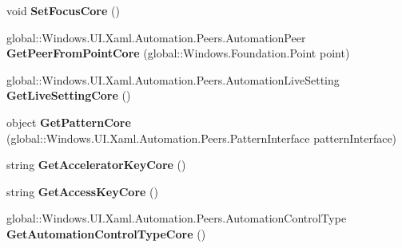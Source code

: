 \begin{DoxyCompactItemize}
void {\bfseries Set\+Focus\+Core} ()
\item 
\mbox{\label{interface_windows_1_1_u_i_1_1_xaml_1_1_automation_1_1_peers_1_1_i_automation_peer_overrides_a74922a18e90493219309cd53efda7477}} 
global\+::\+Windows.\+U\+I.\+Xaml.\+Automation.\+Peers.\+Automation\+Peer {\bfseries Get\+Peer\+From\+Point\+Core} (global\+::\+Windows.\+Foundation.\+Point point)
\item 
\mbox{\label{interface_windows_1_1_u_i_1_1_xaml_1_1_automation_1_1_peers_1_1_i_automation_peer_overrides_ae9707214745a3c5f651e9c0fee6879ea}} 
global\+::\+Windows.\+U\+I.\+Xaml.\+Automation.\+Peers.\+Automation\+Live\+Setting {\bfseries Get\+Live\+Setting\+Core} ()
\item 
\mbox{\label{interface_windows_1_1_u_i_1_1_xaml_1_1_automation_1_1_peers_1_1_i_automation_peer_overrides_a5d2d11301f1cf8aaaa68c84a06f82f23}} 
object {\bfseries Get\+Pattern\+Core} (global\+::\+Windows.\+U\+I.\+Xaml.\+Automation.\+Peers.\+Pattern\+Interface pattern\+Interface)
\item 
\mbox{\label{interface_windows_1_1_u_i_1_1_xaml_1_1_automation_1_1_peers_1_1_i_automation_peer_overrides_a413b5ceeabf488cbe8e51c6db2f1c3fe}} 
string {\bfseries Get\+Accelerator\+Key\+Core} ()
\item 
\mbox{\label{interface_windows_1_1_u_i_1_1_xaml_1_1_automation_1_1_peers_1_1_i_automation_peer_overrides_a9f256fb83255ad9ed034377ed78942de}} 
string {\bfseries Get\+Access\+Key\+Core} ()
\item 
\mbox{\label{interface_windows_1_1_u_i_1_1_xaml_1_1_automation_1_1_peers_1_1_i_automation_peer_overrides_a4b5520afe57923b9abbd09244a8e2b70}} 
global\+::\+Windows.\+U\+I.\+Xaml.\+Automation.\+Peers.\+Automation\+Control\+Type {\bfseries Get\+Automation\+Control\+Type\+Core} ()

\end{DoxyCompactItemize}
